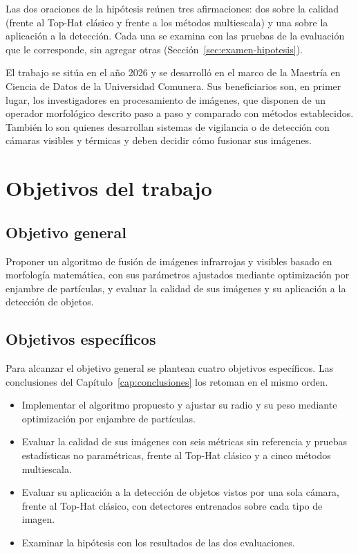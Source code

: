 Las dos oraciones de la hipótesis reúnen tres afirmaciones: dos sobre la calidad (frente al Top-Hat
clásico y frente a los métodos multiescala) y una sobre la aplicación a la detección. Cada una se examina
con las pruebas de la evaluación que le corresponde, sin agregar otras (Sección~\ref{sec:examen-hipotesis}).

El trabajo se sitúa en el año 2026 y se desarrolló en el marco de la Maestría en Ciencia de Datos de la
Universidad Comunera. Sus beneficiarios son, en primer lugar, los investigadores en procesamiento de
imágenes, que disponen de un operador morfológico descrito paso a paso y comparado con métodos
establecidos. También lo son quienes desarrollan sistemas de vigilancia o de detección con cámaras
visibles y térmicas y deben decidir cómo fusionar sus imágenes.

\section{Objetivos del trabajo}
\label{sec:objetivos}

\subsection{Objetivo general}

Proponer un algoritmo de fusión de imágenes infrarrojas y visibles basado en morfología matemática, con
sus parámetros ajustados mediante optimización por enjambre de partículas, y evaluar la calidad de sus
imágenes y su aplicación a la detección de objetos.

\subsection{Objetivos específicos}

Para alcanzar el objetivo general se plantean cuatro objetivos específicos. Las conclusiones del
Capítulo~\ref{cap:conclusiones} los retoman en el mismo orden.

\begin{itemize}
\item Implementar el algoritmo propuesto y ajustar su radio y su peso mediante optimización por enjambre
de partículas.
\item Evaluar la calidad de sus imágenes con seis métricas sin referencia y pruebas estadísticas no
paramétricas, frente al Top-Hat clásico y a cinco métodos multiescala.
\item Evaluar su aplicación a la detección de objetos vistos por una sola cámara, frente al Top-Hat
clásico, con detectores entrenados sobre cada tipo de imagen.
\item Examinar la hipótesis con los resultados de las dos evaluaciones.
\end{itemize}

